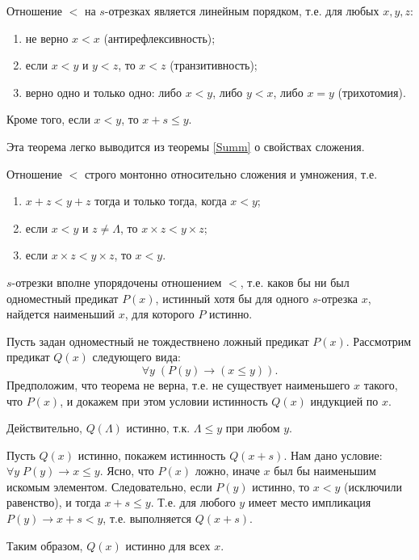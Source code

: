 \begin{thrm}\label{Ord1}
Отношение $<$ на $s$-отрезках является линейным порядком, т.е. для любых $x,y,z$:
\begin{enumerate}
\item не верно $x<x$ (антирефлексивность);
\item если $x<y$ и $y<z$, то $x<z$ (транзитивность);
\item верно одно и только одно: либо $x<y$, либо $y<x$, либо $x=y$ (трихотомия).
\end{enumerate}
Кроме того, если $x<y$, то $x+s\le y$.
\end{thrm}
Эта теорема легко выводится из теоремы \ref{Summ} о свойствах сложения.

\begin{thrm}[Монотонность]\label{Ord2}
Отношение $<$ строго монтонно относительно сложения и умножения, т.е.
\begin{enumerate}[O1]
\item $x+z<y+z$ тогда и только тогда, когда $x<y$;
\item если $x<y$ и $z\ne\Lambda$, то $x\times z<y\times z$;
\item если $x\times z<y\times z$, то $x<y$.
\end{enumerate}
\end{thrm}

\begin{thrm}\label{Ord3}
$s$-отрезки вполне упорядочены отношением $<$, т.е. каков бы ни был одноместный предикат $P(x)$, истинный хотя бы для одного $s$-отрезка $x$, найдется наименьший $x$, для которого $P$ истинно.
\end{thrm}
\pf
Пусть задан одноместный не тождествнено ложный предикат $P(x)$. Рассмотрим предикат $Q(x)$ следующего вида:
$$
\forall y\;(P(y)\to (x\le y)).
$$
Предположим, что теорема не верна, т.е. не существует наименьшего $x$ такого, что $P(x)$, и докажем при этом условии истинность $Q(x)$ индукцией по $x$.

Действительно, $Q(\Lambda)$ истинно, т.к. $\Lambda\le y$ при любом $y$.

Пусть $Q(x)$ истинно, покажем истинность $Q(x+s)$. Нам дано условие: $\forall y\;P(y)\to x\le y$. Ясно, что $P(x)$ ложно, иначе $x$ был бы наименьшим искомым элементом. Следовательно, если $P(y)$ истинно, то $x<y$ (исключили равенство), и тогда $x+s\le y$. Т.е. для любого $y$ имеет место импликация $P(y)\to x+s<y$, т.е. выполняется $Q(x+s)$.

Таким образом, $Q(x)$ истинно для всех $x$.

